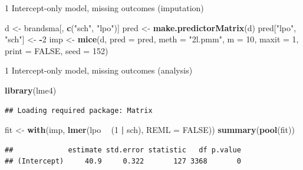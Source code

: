 \documentclass[ignorenonframetext,aspectratio=43]{beamer}
\newenvironment{Shaded}{\begin{snugshade}}{\end{snugshade}}
\newcommand{\KeywordTok}[1]{\textcolor[rgb]{0.13,0.29,0.53}{\textbf{#1}}}
\newcommand{\DataTypeTok}[1]{\textcolor[rgb]{0.13,0.29,0.53}{#1}}
\newcommand{\DecValTok}[1]{\textcolor[rgb]{0.00,0.00,0.81}{#1}}
\newcommand{\StringTok}[1]{\textcolor[rgb]{0.31,0.60,0.02}{#1}}
\newcommand{\OtherTok}[1]{\textcolor[rgb]{0.56,0.35,0.01}{#1}}
\newcommand{\OperatorTok}[1]{\textcolor[rgb]{0.81,0.36,0.00}{\textbf{#1}}}
\newcommand{\NormalTok}[1]{#1}
\begin{document}
\begin{frame}[fragile]{1 Intercept-only model, missing outcomes
(imputation)}

\begin{Shaded}
\begin{Highlighting}[]
\NormalTok{d <-}\StringTok{ }\NormalTok{brandsma[, }\KeywordTok{c}\NormalTok{(}\StringTok{"sch"}\NormalTok{, }\StringTok{"lpo"}\NormalTok{)]}
\NormalTok{pred <-}\StringTok{ }\KeywordTok{make.predictorMatrix}\NormalTok{(d)}
\NormalTok{pred[}\StringTok{"lpo"}\NormalTok{, }\StringTok{"sch"}\NormalTok{] <-}\StringTok{ }\OperatorTok{-}\DecValTok{2}
\NormalTok{imp <-}\StringTok{ }\KeywordTok{mice}\NormalTok{(d, }\DataTypeTok{pred =}\NormalTok{ pred, }\DataTypeTok{meth =} \StringTok{"2l.pmm"}\NormalTok{, }\DataTypeTok{m =} \DecValTok{10}\NormalTok{, }\DataTypeTok{maxit =} \DecValTok{1}\NormalTok{,}
            \DataTypeTok{print =} \OtherTok{FALSE}\NormalTok{, }\DataTypeTok{seed =} \DecValTok{152}\NormalTok{)}
\end{Highlighting}
\end{Shaded}

\end{frame}

\begin{frame}[fragile]{1 Intercept-only model, missing outcomes
(analysis)}

\begin{Shaded}
\begin{Highlighting}[]
\KeywordTok{library}\NormalTok{(lme4)}
\end{Highlighting}
\end{Shaded}

\begin{verbatim}
## Loading required package: Matrix
\end{verbatim}

\begin{Shaded}
\begin{Highlighting}[]
\NormalTok{fit <-}\StringTok{ }\KeywordTok{with}\NormalTok{(imp, }\KeywordTok{lmer}\NormalTok{(lpo }\OperatorTok{~}\StringTok{ }\NormalTok{(}\DecValTok{1} \OperatorTok{|}\StringTok{ }\NormalTok{sch), }\DataTypeTok{REML =} \OtherTok{FALSE}\NormalTok{))}
\KeywordTok{summary}\NormalTok{(}\KeywordTok{pool}\NormalTok{(fit))}
\end{Highlighting}
\end{Shaded}

\begin{verbatim}
##             estimate std.error statistic   df p.value
## (Intercept)     40.9     0.322       127 3368       0
\end{verbatim}

\end{frame}
\end{document}
